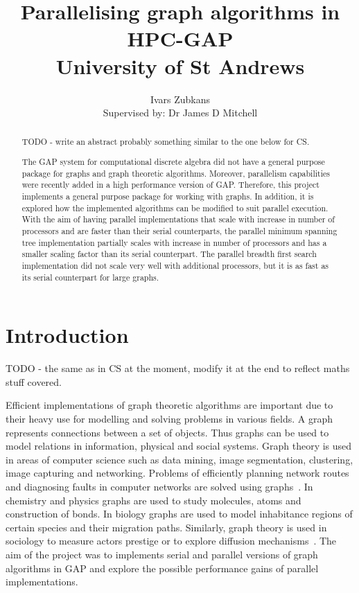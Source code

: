 \documentclass{report}
\title{Parallelising graph algorithms in HPC-GAP \\ \vspace{2 mm} {\large University of St Andrews}}
\author{Ivars Zubkans \\ \small Supervised by: Dr James D Mitchell}
\theoremstyle{plain}
\theoremstyle{definition}
\theoremstyle{remark}
\numberwithin{definition}{chapter}
\numberwithin{example}{chapter}
\numberwithin{figure}{chapter}
\begin{document}
\maketitle

\begin{abstract}

TODO - write an abstract probably something similar to the one below for CS.

The GAP system for computational discrete algebra did not have a general purpose package for graphs and graph theoretic algorithms. Moreover, parallelism capabilities were recently added in a high performance version of GAP. Therefore, this project implements a general purpose package for working with graphs. In addition, it is explored how the implemented algorithms can be modified to suit parallel execution. With the aim of having parallel implementations that scale with increase in number of processors and are faster than their serial counterparts, the parallel minimum spanning tree implementation partially scales with increase in number of processors and has a smaller scaling factor than its serial counterpart. The parallel breadth first search implementation did not scale very well with additional processors, but it is as fast as its serial counterpart for large graphs.
\end{abstract}

\tableofcontents

\chapter{Introduction}

TODO - the same as in CS at the moment, modify it at the end to reflect maths stuff covered.

Efficient implementations of graph theoretic algorithms are important due to their heavy use for modelling and solving problems in various fields. A graph represents connections between a set of objects. Thus graphs can be used to model relations in information, physical and social systems. Graph theory is used in areas of computer science such as data mining, image segmentation, clustering, image capturing and networking. Problems of efficiently planning network routes and diagnosing faults in computer networks are solved using graphs~\cite{6005872}. In chemistry and physics graphs are used to study molecules, atoms and construction of bonds. In biology graphs are used to model inhabitance regions of certain species and their migration paths. Similarly, graph theory is used in sociology to measure actors prestige or to explore diffusion mechanisms~\cite{shirinivas2010applications}. The aim of the project was to implements serial and parallel versions of graph algorithms in GAP and explore the possible performance gains of parallel implementations.
\end{document}
